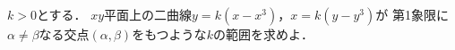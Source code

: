 \documentclass[../../main.tex]{subfiles}
\begin{document}
$k>0$とする．
$xy$平面上の二曲線$y=k(x-x^3)$，$x=k(y-y^3)$が
第1象限に$\alpha\neq\beta$なる交点$(\alpha,\beta)$をもつような$k$の範囲を求めよ．
\end{document}
